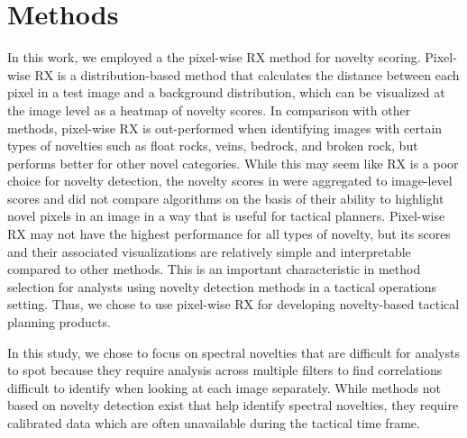 \section{Methods}
In this work, we employed a the pixel-wise RX method for novelty scoring.
Pixel-wise RX is a distribution-based method that calculates the distance between each pixel in a test image and a background distribution, which can be visualized at the image level as a heatmap of novelty scores. 
In comparison with other methods, pixel-wise RX is out-performed when identifying images with certain types of novelties such as float rocks, veins, bedrock, and broken rock, but performs better for other novel categories. 
While this may seem like RX is a poor choice for novelty detection, the novelty scores in \cite{kerner2020comparison} were aggregated to image-level scores and did not compare algorithms on the basis of their ability to highlight novel pixels in an image in a way that is useful for tactical planners. 
Pixel-wise RX may not have the highest performance for all types of novelty, but its scores and their associated visualizations are relatively simple and interpretable compared to other methods. 
This is an important characteristic in method selection for analysts using novelty detection methods in a tactical operations setting. Thus, we chose to use pixel-wise RX for developing novelty-based tactical planning products. 

In this study, we chose to focus on spectral novelties that are difficult for analysts to spot because they require analysis across multiple filters to find correlations difficult to identify when looking at each image separately. 
While methods not based on novelty detection exist that help identify spectral novelties, they require calibrated data which are often unavailable during the tactical time frame. 

